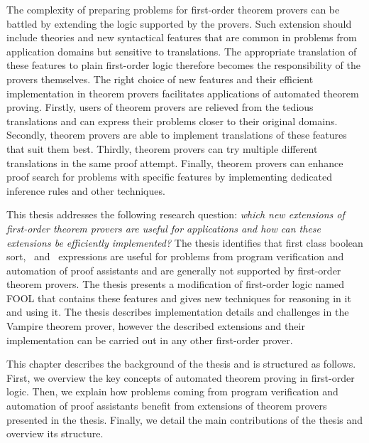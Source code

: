 The complexity of preparing problems for first-order theorem provers can be battled by extending the logic supported by the provers. Such extension should include theories and new syntactical features that are common in problems from application domains but sensitive to translations. The appropriate translation of these features to plain first-order logic therefore becomes the responsibility of the provers themselves. The right choice of new features and their efficient implementation in theorem provers facilitates applications of automated theorem proving. Firstly, users of theorem provers are relieved from the tedious translations and can express their problems closer to their original domains. Secondly, theorem provers are able to implement translations of these features that suit them best. Thirdly, theorem provers can try multiple different translations in the same proof attempt. Finally, theorem provers can enhance proof search for problems with specific features by implementing dedicated inference rules and other techniques.

This thesis addresses the following research question: \emph{which new extensions of first-order theorem provers are useful for applications and how can these extensions be efficiently implemented?} The thesis identifies that first class boolean sort, \ITE\ and \LETIN\ expressions are useful for problems from program verification and automation of proof assistants and are generally not supported by first-order theorem provers. The thesis presents a modification of first-order logic named FOOL that contains these features and gives new techniques for reasoning in it and using it. The thesis describes implementation details and challenges in the Vampire theorem prover, however the described extensions and their implementation can be carried out in any other first-order prover.

This chapter describes the background of the thesis and is structured as follows. First, we overview the key concepts of automated theorem proving in first-order logic. Then, we explain how problems coming from program verification and automation of proof assistants benefit from extensions of theorem provers presented in the thesis. Finally, we detail the main contributions of the thesis and overview its structure.


